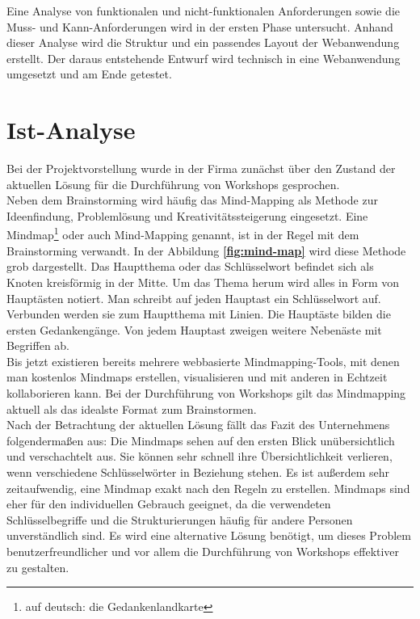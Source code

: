 \newpage
Eine Analyse von funktionalen und nicht-funktionalen Anforderungen sowie die Muss- und Kann-Anforderungen wird in der ersten Phase untersucht. Anhand dieser Analyse wird die Struktur und ein passendes Layout der Webanwendung erstellt. Der daraus entstehende Entwurf wird technisch in eine Webanwendung umgesetzt und am Ende getestet.

\section{Ist-Analyse}
\label{sec:ist-analyse}
Bei der Projektvorstellung wurde in der Firma zunächst über den Zustand der aktuellen Lösung für die Durchführung von Workshops gesprochen.
\\

Neben dem Brainstorming wird häufig das Mind-Mapping als Methode zur Ideenfindung, Problemlösung und Kreativitätssteigerung eingesetzt.  Eine Mindmap\footnote{auf deutsch: die Gedankenlandkarte} oder auch Mind-Mapping genannt, ist in der Regel mit dem Brainstorming verwandt. In der Abbildung \hyperref[sec:mind-map]{\textbf{\ref{fig:mind-map}}} wird diese Methode grob dargestellt. Das Hauptthema oder das Schlüsselwort befindet sich als Knoten kreisförmig in der Mitte. Um das Thema herum wird alles in Form von Hauptästen notiert. Man schreibt auf jeden Hauptast ein Schlüsselwort auf. Verbunden werden sie zum Hauptthema mit Linien. Die Hauptäste bilden die ersten Gedankengänge. Von jedem Hauptast zweigen weitere Nebenäste mit Begriffen ab.
\\

Bis jetzt existieren bereits mehrere webbasierte Mindmapping-Tools, mit denen man kostenlos Mindmaps erstellen, visualisieren und mit anderen in Echtzeit kollaborieren kann. Bei der Durchführung von Workshops gilt das Mindmapping aktuell als das idealste Format zum Brainstormen.
\\

Nach der Betrachtung der aktuellen Lösung fällt das Fazit des Unternehmens folgendermaßen aus: Die Mindmaps sehen auf den ersten Blick unübersichtlich und verschachtelt aus. Sie können sehr schnell ihre Übersichtlichkeit verlieren, wenn verschiedene Schlüsselwörter in Beziehung stehen. Es ist außerdem sehr zeitaufwendig, eine Mindmap exakt nach den Regeln zu erstellen. Mindmaps sind eher für den individuellen Gebrauch geeignet, da die verwendeten Schlüsselbegriffe und die Strukturierungen häufig für andere Personen unverständlich sind.
Es wird eine alternative Lösung benötigt, um dieses Problem benutzerfreundlicher und vor allem die Durchführung von Workshops effektiver zu gestalten.  

